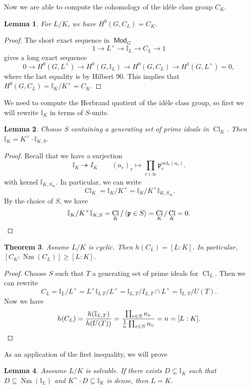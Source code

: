 \documentclass[leqno, openany]{memoir}
\newtheorem{thm}{Theorem}[section]
\newtheorem{lem}[thm]{Lemma}
\theoremstyle{definition}
\theoremstyle{remark}
\theoremstyle{plain}
\theoremstyle{definition}
\theoremstyle{remark}
\newcommand{\I}{\mathbb{I}}
\newcommand{\mf}[1]{\mathfrak{#1}}
\newcommand{\mr}[1]{\mathrm{#1}}
\DeclareMathOperator{\Cl}{Cl}
\DeclareMathOperator{\Mod}{\mathsf{Mod}}
\DeclareMathOperator{\Nm}{Nm}
\begin{document}
Now we are able to compute the cohomology of the id\`ele class group $C_K$. 

\begin{lem} For $L/K$, we have $H^0(G, C_L) = C_K$.  \end{lem}

\begin{proof} The short exact sequence in $\Mod_G$ \[ 1 \to L^{\times} \to \I_L
    \to C_L \to 1 \] gives a long exact sequence \[ 0 \to H^0(G, L^{\times})
\to H^0(G, \I_L) \to H^0(G, C_L) \to H^1(G, L^{\times}) = 0, \] where the last
equality is by Hilbert 90. This implies that $H^0(G, C_L) = \I_K/K^{\times} =
C_K$.  \end{proof}

We need to compute the Herbrand quotient of the id\`ele class group, so first
we will rewrite $\I_K$ in terms of $S$-units.

\begin{lem} Choose $S$ containing a generating set of prime ideals in $\Cl_K$.
Then $\I_K = K^{\times} \cdot \I_{K, S}$.  \end{lem}

\begin{proof} Recall that we have a surjection \[ \I_K \twoheadrightarrow I_K
    \qquad {(a_v)}_v \mapsto \prod_{v \nmid \infty} \mf{p}_v^{\mr{ord}_v(a_v)}.
    \] with kernel $\I_{K, S_{\infty}}$. In particular, we can write \[ \Cl_K =
\I_K / K^{\times} = \I_K / K^{\times} \I_{K, S_{\infty}}. \] By the choice of
$S$, we have \[ \I_K/K^{\times} \I_{K,S} = \Cl_K/\ev{\mf{p} \in S} = \Cl_K /
\Cl_K = 0. \qedhere \] \end{proof}

\begin{thm} Assume $L/K$ is cyclic. Then $h(C_L) = [L:K]$. In particular,
$[C_K: \Nm(C_L)] \geq [L:K]$.  \end{thm}

\begin{proof} Choose $S$ such that $T$ a generating set of prime ideals for
    $\Cl_L$. Then we can rewrite \[ C_L = \I_L/L^{\times} = L^{\times}
        \I_{L.T}/L^{\times} = \I_{L,T}/I_{L,T} \cap L^{\times} = \I_{L,T}/U(T).
        \] Now we have \[ h(C_L) = \frac{h(\I_{L, T})}{h(U(T))} =
    \frac{\prod_{v \in S} n_v}{\frac{1}{n} \prod_{v \in S} n_v} = n = [L:K].
\qedhere \] \end{proof}

As an application of the first inequality, we will prove

\begin{lem} Asssume $L/K$ is solvable. If there exists $D \subseteq \I_K$ such
that $D \subseteq \Nm(\I_L)$ and $K^{\times} \cdot D \subseteq \I_K$ is dense,
then $L = K$.  \end{lem}
\end{document}
